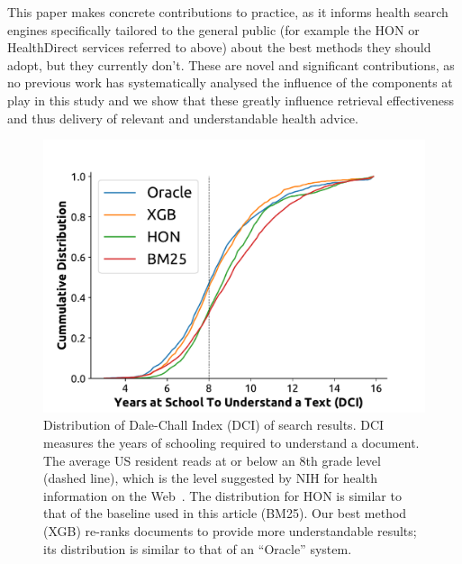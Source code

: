 This paper makes concrete contributions to practice, as it informs health search engines specifically tailored to the general public (for example the HON or HealthDirect services referred to above) about the best methods they should adopt, but they currently don't. These are novel and significant contributions, as no previous work has systematically analysed the influence of the components at play in this study and we show that these greatly influence retrieval effectiveness and thus delivery of relevant and understandable health advice.

\begin{figure}[t!]
   \centering
   \includegraphics[width=.51\textwidth]{graphics/cumdist}
    \caption{Distribution of Dale-Chall Index (DCI) of search results. DCI measures the years of schooling required to understand a document. The average US resident reads at or below an 8th grade level (dashed line)\cite{cowan04,wallace04,davis04,stossel12}, which is the level suggested by NIH for health information on the Web~\cite{clear94}. The distribution for HON is similar to that of the baseline used in this article (BM25). Our best method (XGB) re-ranks documents to provide more understandable results; its distribution is similar to that of an ``Oracle'' system.}
   \label{fig:dist}
\end{figure}






